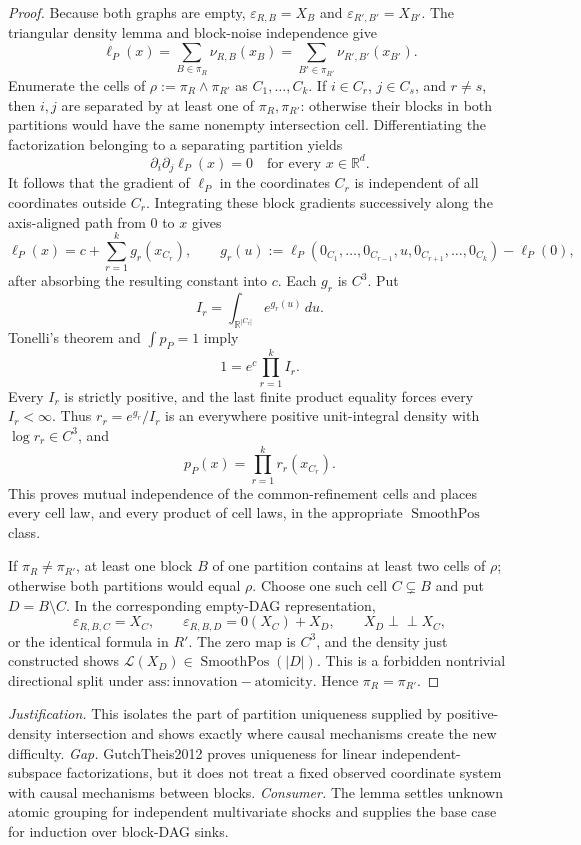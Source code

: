 \documentclass{article}
\begin{document}
\begin{proof}
Because both graphs are empty, \(\varepsilon_{R,B}=X_B\) and \(\varepsilon_{R',B'}=X_{B'}\).  The triangular density lemma and block-noise independence give
\[
 \ell_P(x)=\sum_{B\in\pi_R}\nu_{R,B}(x_B)
 =\sum_{B'\in\pi_{R'}}\nu_{R',B'}(x_{B'}).
\]
Enumerate the cells of \(\rho:=\pi_R\wedge\pi_{R'}\) as \(C_1,\ldots,C_k\).  If \(i\in C_r\), \(j\in C_s\), and \(r\neq s\), then \(i,j\) are separated by at least one of \(\pi_R,\pi_{R'}\): otherwise their blocks in both partitions would have the same nonempty intersection cell.  Differentiating the factorization belonging to a separating partition yields
\[
 \partial_i\partial_j\ell_P(x)=0
 \quad\text{for every }x\in\mathbb R^d.
\]
It follows that the gradient of \(\ell_P\) in the coordinates \(C_r\) is independent of all coordinates outside \(C_r\).  Integrating these block gradients successively along the axis-aligned path from \(0\) to \(x\) gives
\[
 \ell_P(x)=c+\sum_{r=1}^k g_r(x_{C_r}),
 \qquad
 g_r(u):=\ell_P(0_{C_1},\ldots,0_{C_{r-1}},u,0_{C_{r+1}},\ldots,0_{C_k})-\ell_P(0),
\]
after absorbing the resulting constant into \(c\).  Each \(g_r\) is \(C^3\).  Put
\[
 I_r=\int_{\mathbb R^{|C_r|}}e^{g_r(u)}\,du.
\]
Tonelli's theorem and \(\int p_P=1\) imply
\[
 1=e^c\prod_{r=1}^k I_r.
\]
Every \(I_r\) is strictly positive, and the last finite product equality forces every \(I_r<\infty\).  Thus \(r_r=e^{g_r}/I_r\) is an everywhere positive unit-integral density with \(\log r_r\in C^3\), and
\[
 p_P(x)=\prod_{r=1}^k r_r(x_{C_r}).
\]
This proves mutual independence of the common-refinement cells and places every cell law, and every product of cell laws, in the appropriate \(\operatorname{SmoothPos}\) class.

If \(\pi_R\neq\pi_{R'}\), at least one block \(B\) of one partition contains at least two cells of \(\rho\); otherwise both partitions would equal \(\rho\).  Choose one such cell \(C\subsetneq B\) and put \(D=B\setminus C\).  In the corresponding empty-DAG representation,
\[
 \varepsilon_{R,B,C}=X_C,
 \qquad
 \varepsilon_{R,B,D}=0(X_C)+X_D,
 \qquad
 X_D\perp\!\!\!\perp X_C,
\]
or the identical formula in \(R'\).  The zero map is \(C^3\), and the density just constructed shows \(\mathcal L(X_D)\in\operatorname{SmoothPos}(|D|)\).  This is a forbidden nontrivial directional split under \(\mathrm{ass:innovation-atomicity}\).  Hence \(\pi_R=\pi_{R'}\).
\end{proof}
\par\smallskip\noindent \textit{Justification.} This isolates the part of partition uniqueness supplied by positive-density intersection and shows exactly where causal mechanisms create the new difficulty. \textit{Gap.} GutchTheis2012 proves uniqueness for linear independent-subspace factorizations, but it does not treat a fixed observed coordinate system with causal mechanisms between blocks. \textit{Consumer.} The lemma settles unknown atomic grouping for independent multivariate shocks and supplies the base case for induction over block-DAG sinks.
\end{document}
